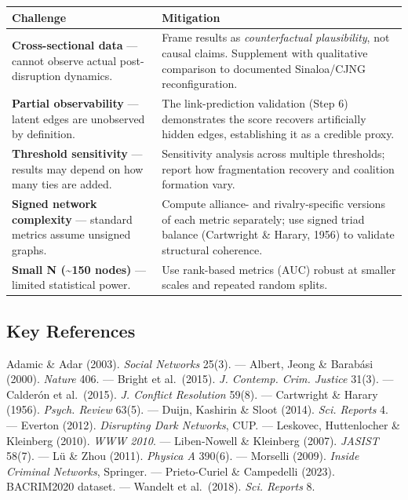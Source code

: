 \documentclass[
  11pt,
]{article}
\begin{document}
\begin{longtable}[]{@{}
  >{\raggedright\arraybackslash}p{}
  >{\raggedright\arraybackslash}p{}@{}}
\toprule\noalign{}
\begin{minipage}[b]{\linewidth}\raggedright
Challenge
\end{minipage} & \begin{minipage}[b]{\linewidth}\raggedright
Mitigation
\end{minipage} \\
\midrule\noalign{}
\endhead
\bottomrule\noalign{}
\endlastfoot
\textbf{Cross-sectional data} --- cannot observe actual post-disruption
dynamics. & Frame results as \emph{counterfactual plausibility}, not
causal claims. Supplement with qualitative comparison to documented
Sinaloa/CJNG reconfiguration. \\
\textbf{Partial observability} --- latent edges are unobserved by
definition. & The link-prediction validation (Step 6) demonstrates the
score recovers artificially hidden edges, establishing it as a credible
proxy. \\
\textbf{Threshold sensitivity} --- results may depend on how many ties
are added. & Sensitivity analysis across multiple thresholds; report how
fragmentation recovery and coalition formation vary. \\
\textbf{Signed network complexity} --- standard metrics assume unsigned
graphs. & Compute alliance- and rivalry-specific versions of each metric
separately; use signed triad balance (Cartwright \& Harary, 1956) to
validate structural coherence. \\
\textbf{Small N (\textasciitilde150 nodes)} --- limited statistical
power. & Use rank-based metrics (AUC) robust at smaller scales and
repeated random splits. \\
\end{longtable}

\subsection{Key References}\label{key-references}

Adamic \& Adar (2003). \emph{Social Networks} 25(3). --- Albert, Jeong
\& Barabási (2000). \emph{Nature} 406. --- Bright et al.~(2015).
\emph{J. Contemp. Crim. Justice} 31(3). --- Calderón et al.~(2015).
\emph{J. Conflict Resolution} 59(8). --- Cartwright \& Harary (1956).
\emph{Psych. Review} 63(5). --- Duijn, Kashirin \& Sloot (2014).
\emph{Sci. Reports} 4. --- Everton (2012). \emph{Disrupting Dark
Networks}, CUP. --- Leskovec, Huttenlocher \& Kleinberg (2010).
\emph{WWW 2010}. --- Liben-Nowell \& Kleinberg (2007). \emph{JASIST}
58(7). --- Lü \& Zhou (2011). \emph{Physica A} 390(6). --- Morselli
(2009). \emph{Inside Criminal Networks}, Springer. --- Prieto-Curiel \&
Campedelli (2023). BACRIM2020 dataset. --- Wandelt et al.~(2018).
\emph{Sci. Reports} 8.
\end{document}
